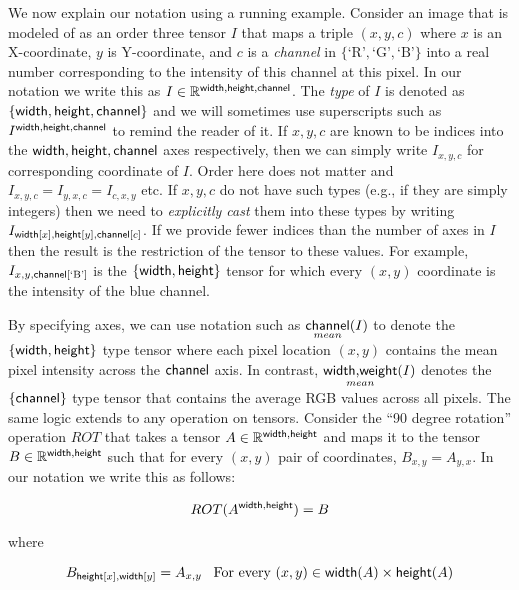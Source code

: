 \documentclass{article}
\newcommand{\mean}[1]{\sfun{mean}{#1}}
\begin{document}
We now explain our notation using a running example. Consider an image that is modeled of as an order three tensor $I$ that maps a triple $(x,y,c)$ where $x$ is an X-coordinate, $y$ is Y-coordinate, and $c$ is a \emph{channel} in $\{ \text{`R'}, \text{`G'}, \text{`B'} \}$ into a real number corresponding to the intensity of this channel at this pixel.
In our notation we write this as $I \in \mathbb{R}^{\mathsf{width},\mathsf{height},\mathsf{channel}}$. 
The \emph{type} of $I$ is denoted as $\{ \mathsf{width},\mathsf{height},\mathsf{channel} \}$ and we will sometimes use  superscripts such as $I^{\mathsf{width},\mathsf{height},\mathsf{channel}}$ to remind the reader of it. 
If $x,y,c$ are known to be indices into the $\mathsf{width},\mathsf{height},\mathsf{channel}$ axes respectively, then we can simply write $I_{x,y,c}$ for corresponding coordinate of $I$. Order here does not matter and $I_{x,y,c} = I_{y,x,c}=I_{c,x,y}$ etc. 
If $x,y,c$ do not have such types (e.g., if they are simply integers) then we need to \emph{explicitly cast} them into these types by writing $I_{\mathsf{width}[x],\mathsf{height}[y],\mathsf{channel}[c]}$.
If we provide fewer indices than the number of axes in $I$ then the result is the restriction of the tensor to these values.
For example, $I_{x,y,\mathsf{channel}[\text{`B'}]}$ is the $\{ \mathsf{width} , \mathsf{height} \}$ tensor for which every $(x,y)$  coordinate is the intensity of the blue channel.


By specifying axes, we can use notation such as  $\mean{\name{channel}}(I)$ to denote the $\{ \mathsf{width} , \mathsf{height} \}$ type tensor where each pixel location $(x,y)$ contains the mean pixel intensity across the $\mathsf{channel}$ axis.
In contrast, $\mean{\name{width},\name{weight}}(I)$ denotes the $\{ \mathsf{channel} \}$ type tensor that contains the average RGB values across all pixels.
The same logic extends to any operation on tensors. Consider the ``90 degree rotation'' operation $ROT$ that takes a tensor $A \in \mathbb{R}^{\mathsf{width},\mathsf{height}}$ and maps it to the tensor $B \in \mathbb{R}^{\mathsf{width},\mathsf{height}}$ such that for every $(x,y)$ pair of coordinates, $B_{x,y} = A_{y,x}$.
In our notation we write this as follows: 

\[
  ROT(A^{\mathsf{width},\mathsf{height}}) = B 
\]

where

\begin{equation}
  B_{\mathsf{height}[x],\mathsf{width}[y]} = A_{x,y} \;\;\; \text{For every } (x,y) \in \mathsf{width}(A)\times \mathsf{height}(A) \label{eq:rotate}
\end{equation}
\end{document}
